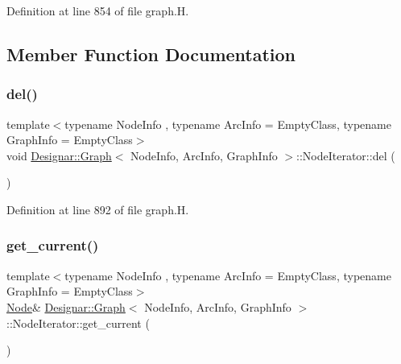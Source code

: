 Definition at line 854 of file graph.\+H.



\subsection{Member Function Documentation}
\mbox{\label{class_designar_1_1_graph_1_1_node_iterator_a8ff7d2de6b10d3fd60774db675340259}} 
\subsubsection{\texorpdfstring{del()}{del()}}
{\footnotesize\ttfamily template$<$typename Node\+Info , typename Arc\+Info  = Empty\+Class, typename Graph\+Info  = Empty\+Class$>$ \\
void \hyperlink{class_designar_1_1_graph}{Designar\+::\+Graph}$<$ Node\+Info, Arc\+Info, Graph\+Info $>$\+::Node\+Iterator\+::del (\begin{DoxyParamCaption}{ }\end{DoxyParamCaption})\hspace{0.3cm}{\ttfamily [inline]}}



Definition at line 892 of file graph.\+H.

\mbox{\label{class_designar_1_1_graph_1_1_node_iterator_a79268477058bf2d213dc11581c12a125}} 
\subsubsection{\texorpdfstring{get\+\_\+current()}{get\_current()}\hspace{0.1cm}{\footnotesize\ttfamily [1/2]}}
{\footnotesize\ttfamily template$<$typename Node\+Info , typename Arc\+Info  = Empty\+Class, typename Graph\+Info  = Empty\+Class$>$ \\
\hyperlink{class_designar_1_1_graph_a5dfc7dba9d092ac489c72e40390c37d0}{Node}\& \hyperlink{class_designar_1_1_graph}{Designar\+::\+Graph}$<$ Node\+Info, Arc\+Info, Graph\+Info $>$\+::Node\+Iterator\+::get\+\_\+current (\begin{DoxyParamCaption}{ }\end{DoxyParamCaption})\hspace{0.3cm}{\ttfamily [inline]}}



